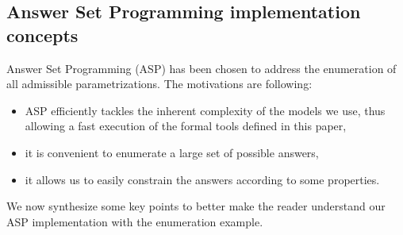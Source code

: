 \begin{comment}
\begin{definition}[Admissible parametrization \& Admissible parametrization with respect to inferred parameters]
\label{def:param_enum_inf}
Let $\PH = (\PHs, \PHl, \PHh)$ be a PH so that IG inference is possible, and $\IG = (\Gamma, E_+,
E_-)$ the inferred IG.
A parametrization $K$ on $\IG$ is said to be \emph{admissible} iff it respects
the extreme values assumption, the activity assumption and the monotonicity assumption.
A parametrization $K$ on $\IG$ is said to be \emph{admissible with respect to the
inferred parameters} iff it is admissible and that all parameters that can be inferred regarding
\pref{pps:param_K} are equal to their inferred value.
\end{definition}

\todo{utilité de “Admissible parametrization” seul ?}
\end{comment}


\subsection{Answer Set Programming implementation concepts}



\newcommand{\ti}[1]{\texttt{\textit{#1}}}
\newcommand{\aspil}[1]{\texttt{#1}}
\newcommand{\asp}[1]{\begin{itemize} \item[] \aspil{#1} \end{itemize}}

Answer Set Programming (ASP) \cite{Baral03} has been chosen to address the enumeration of all admissible parametrizations.
The motivations are following:
\begin{itemize}
  \item ASP efficiently tackles the inherent complexity of the models we use, thus allowing a fast execution of the formal tools defined in this paper,
  \item it is convenient to enumerate a large set of possible answers,
  \item it allows us to easily constrain the answers according to some properties.
\end{itemize}
We now synthesize some key points to better make the reader understand our ASP implementation with the enumeration example.

